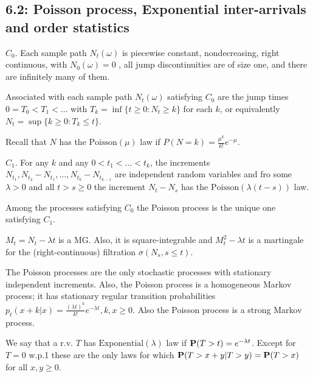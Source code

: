 \subsection*{6.2: Poisson process, Exponential inter-arrivals and order statistics}

\begin{condition*}
$\boxed{C_0}$. Each sample path $N_t(\omega)$ is piecewise constant, nondecreasing, right continuous, with $N_0(\omega)=0$ , all jump discontinuities are of size one, and there are infinitely many of them.
\end{condition*}

Associated with each sample path $N_t(\omega)$ satisfying $\boxed{C_0}$ are the jump times $0=T_0<T_1<\dots$ with $T_k = \inf\{t \geq 0:N_t\geq k\}$ for each $k$, or equivalently $N_t = \sup\{k \geq 0 : T_k \leq t\}$. 

Recall that $N$ has the $\text{Poisson}(\mu)$ law if $P(N=k)=\frac{\mu^k}{k!}e^{-\mu}$.

\begin{condition*}
$\boxed{C_1}$. For any $k$ and any $0<t_1<\dots<t_k$, the increments $N_{t_1}, N_{t_2}-N_{t_1},\dots,N_{t_k}-N_{t_{k-1}}$ are independent random variables and fro some $\lambda > 0$ and all $t>s\geq0$ the increment $N_t-N_s$ has the $\text{Poisson}(\lambda(t-s))$ law.
\end{condition*}

\begin{definition*}
Among the processes satisfying $\boxed{C_0}$ the Poisson process is the unique one satisfying $\boxed{C_1}$.
\end{definition*}

\begin{corollary*}
$M_t = N_t - \lambda t$ is a MG. Also, it is square-integrable and $M_t^2 - \lambda t$ is a martingale for the (right-continuous) filtration $\sigma(N_s,s\leq t)$.
\end{corollary*}

\begin{proposition*}
The Poisson processes are the only stochastic processes with stationary independent increments. Also, the Poisson process is a homogeneous Markov process; it has stationary regular transition probabilities $p_t(x+k|x)=\frac{(\lambda t)^k}{k!} e^{-\lambda t}, k,x\geq 0$. Also the Poisson process is a strong Markov process.
\end{proposition*}

\begin{proposition*}
We say that a r.v. $T$ has $\text{Exponential}(\lambda)$ law if $\mathbf{P}(T>t)=e^{-\lambda t}$. Except for $T=0$ w.p.1 these are the only laws for which $\mathbf{P}(T>x+y|T>y)=\mathbf{P}(T>x)$ for all $x,y\geq0$.
\end{proposition*}

